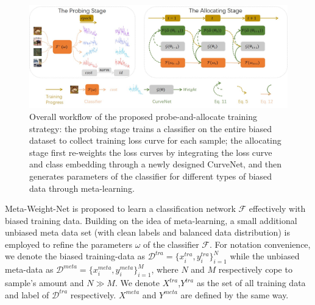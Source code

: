 \documentclass[letterpaper]{article} %
\begin{document}
\begin{figure}[t]
\begin{center}
\includegraphics[width=0.85\linewidth]{figs/framework.jpg}
\end{center}
\caption{Overall workflow of the proposed probe-and-allocate training strategy: the probing stage trains a classifier on the entire biased dataset to collect training loss curve for each sample; the allocating stage first re-weights the loss curves by integrating the loss curve and class embedding through a newly designed CurveNet, and then generates parameters of the classifier for different types of biased data through meta-learning.
}
\label{fig:framework}
\end{figure}

Meta-Weight-Net is proposed to learn a classification network $\mathcal{F}$ effectively with biased training data.
Building on the idea of meta-learning, a small additional unbiased meta data set (with clean labels and balanced data distribution) is employed to refine the parameters $\omega$ of the classifier $\mathcal{F}$.
For notation convenience, we denote the biased training-data as $\mathcal{D}^{tra}=\{x^{tra}_i,y^{tra}_i\}_{i=1}^N$ while the unbiased meta-data as $\mathcal{D}^{meta}=\{x^{meta}_i,y^{meta}_i\}_{i=1}^M$,  where $N$ and $M$ respectively cope to sample's amount and $N \gg M$.
We denote $X^{tra}$,$Y^{tra}$ as the set of all training data and label of $\mathcal{D}^{tra}$ respectively.
$X^{meta}$ and $Y^{meta}$ are defined by the same way.
\end{document}
